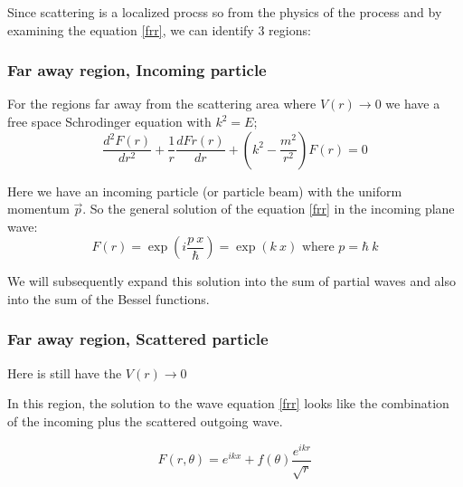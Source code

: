 Since scattering is a localized procss so from the physics of the process and by examining the equation \eqref{frr},  we can identify 3 regions:

\subsubsection{\textbf{Far away region, Incoming particle}}

For the regions far away from the scattering area where $ V(r) \rightarrow 0 $ we have a free space Schrodinger equation with $ k^2 = E $;
\begin{equation}\label{2DS1H}
\frac{d^2 F(r)}{dr^2} + \frac{1}{r}\frac{d Fr(r)}{dr} + \left(k^2 - \frac{m^2}{r^2}\right)F(r) = 0
\end{equation}
 
Here we have an incoming particle (or particle beam) with the uniform momentum $ \vec{p} $. So the general solution of the equation \eqref{frr} in the incoming plane wave:
\begin{equation}\label{free2D}
    F(r) = \exp(i\frac{p\ x}{\hbar}) = \exp(k\ x) \text{  where } p = \hbar \ k
\end{equation}

We will subsequently expand this solution into the sum of partial waves and also into the  sum of the Bessel functions.

\subsubsection{\textbf{Far away region, Scattered particle}}

Here is still have the $ V(r) \rightarrow 0 $

In this region, the solution to the wave equation \eqref{frr} looks like the combination of the incoming plus the scattered outgoing wave.

\begin{equation}\label{free2D}
    F(r,\theta) = e^{ikx} + f(\theta)\frac{e^{ikr}}{\sqrt{r}}
\end{equation}

